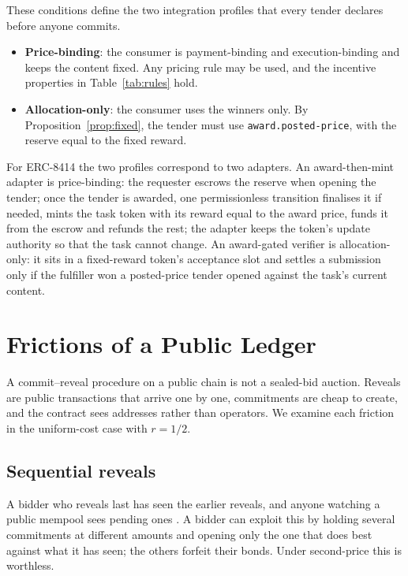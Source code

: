 \documentclass[11pt]{article}
\theoremstyle{definition}
\theoremstyle{remark}
\newcommand{\code}[1]{\texttt{#1}}
\begin{document}
These conditions define the two integration profiles that every tender declares before anyone commits.

\begin{itemize}[leftmargin=*,itemsep=2pt]
\item \textbf{Price-binding}: the consumer is payment-binding and execution-binding and keeps the content fixed. Any pricing rule may be used, and the incentive properties in Table~\ref{tab:rules} hold.
\item \textbf{Allocation-only}: the consumer uses the winners only. By Proposition~\ref{prop:fixed}, the tender must use \code{award.posted-price}, with the reserve equal to the fixed reward.
\end{itemize}

For ERC-8414 the two profiles correspond to two adapters. An award-then-mint adapter is price-binding: the requester escrows the reserve when opening the tender; once the tender is awarded, one permissionless transition finalises it if needed, mints the task token with its reward equal to the award price, funds it from the escrow and refunds the rest; the adapter keeps the token's update authority so that the task cannot change. An award-gated verifier is allocation-only: it sits in a fixed-reward token's acceptance slot and settles a submission only if the fulfiller won a posted-price tender opened against the task's current content.

\section{Frictions of a Public Ledger}
\label{sec:ledger}

A commit--reveal procedure on a public chain is not a sealed-bid auction. Reveals are public transactions that arrive one by one, commitments are cheap to create, and the contract sees addresses rather than operators. We examine each friction in the uniform-cost case with $r = 1/2$.

\subsection{Sequential reveals}

A bidder who reveals last has seen the earlier reveals, and anyone watching a public mempool sees pending ones \citep{daian2020}. A bidder can exploit this by holding several commitments at different amounts and opening only the one that does best against what it has seen; the others forfeit their bonds. Under second-price this is worthless.
\end{document}
